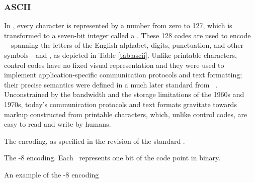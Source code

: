 \subsubsection{ASCII}
In , every character is represented by a number from zero to 127,
which is transformed to a seven-bit integer called a .
These 128 codes are used to encode ---spanning the
letters of the English alphabet, digits, punctuation, and other symbols---and
, as depicted in Table \ref{tab:ascii}.  Unlike printable
characters, control codes have no fixed visual representation and they were used
to implement application-specific communication protocols and text formatting;
their precise semantics were defined in a much later standard from
\citeyear{iso72}~\cite{iso72}. Unconstrained by the bandwidth and the storage
limitations of the 1960s and 1970s, today's communication protocols and text
formats gravitate towards markup constructed from printable characters, which,
unlike control codes, are easy to read and write by humans.

\begin{table}
  
  \caption{The  encoding, as specified in the \citeyear{asa86}
    revision of the standard \cite{asa86}.}
  \label{tab:ascii}
\end{table}

\begin{table}
  
  \caption{The -8 encoding. Each \textvisiblespace\ represents
    one bit of the  code point in binary.}
  \label{tab:utf8}
\end{table}

\begin{table}
  
  \caption{An example of the -8 encoding}
  \label{tab:utf8-example}
\end{table}


